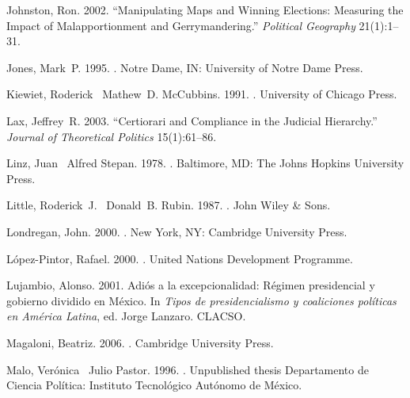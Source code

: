 \documentclass[12 pt, letter]{article}
\begin{document}
\begin{thebibliography}{77}
Johnston, Ron. 2002.
\newblock ``Manipulating Maps and Winning Elections: Measuring the Impact of
  Malapportionment and Gerrymandering.'' {\em Political Geography} 21(1):1--31.

Jones, Mark~P. 1995.
.
\newblock Notre Dame, IN:  University of Notre Dame Press.

Kiewiet, Roderick \harvardand\ Mathew~D. McCubbins. 1991.
.
\newblock University of Chicago Press.

Lax, Jeffrey~R. 2003.
\newblock ``Certiorari and Compliance in the Judicial Hierarchy.'' {\em Journal
  of Theoretical Politics} 15(1):61--86.

Linz, Juan \harvardand\ Alfred Stepan. 1978.
.
\newblock Baltimore, MD:  The Johns Hopkins University Press.

Little, Roderick~J. \harvardand\ Donald~B. Rubin. 1987.
.
\newblock John Wiley \& Sons.

Londregan, John. 2000.
.
\newblock New York, NY:  Cambridge University Press.

L\'opez-Pintor, Rafael. 2000.
.
\newblock United Nations Development Programme.

Lujambio, Alonso. 2001.
\newblock Adi\'os a la excepcionalidad: {R}\'egimen presidencial y gobierno
  dividido en {M}\'exico.  In {\em Tipos de presidencialismo y coaliciones
  pol\'iticas en {A}m\'erica {L}atina}, ed. Jorge Lanzaro.
\newblock CLACSO.

Magaloni, Beatriz. 2006.
.
\newblock Cambridge University Press.

Malo, Ver\'onica \harvardand\ Julio Pastor. 1996.
.
\newblock Unpublished thesis Departamento de Ciencia Pol\'itica:  Instituto
  Tecnol\'ogico Aut\'onomo de M\'exico.


\end{thebibliography}
\end{document}
